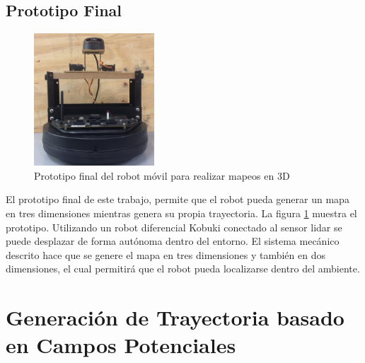 \subsection{Prototipo Final}
\begin{figure}%
	\centering \footnotesize
	\includegraphics[width=0.40\textwidth]{images/kbkiReal3D.jpg}
	\captionsetup{font=footnotesize}
	\caption{Prototipo final del robot móvil para realizar mapeos en 3D}
	\label{fig:ProtoFinal}
\end{figure}
El prototipo final de este trabajo, permite que el robot pueda generar un mapa en tres dimensiones 
mientras genera su propia trayectoria. La figura \ref{fig:ProtoFinal} muestra el prototipo. Utilizando
un robot diferencial Kobuki conectado al sensor lidar se puede desplazar de forma autónoma
dentro del entorno. El sistema mecánico descrito hace que se genere el mapa en tres dimensiones
y también en dos dimensiones, el cual permitirá que el robot pueda localizarse dentro del ambiente.



\section{Generaci\'on de Trayectoria basado en Campos Potenciales}
\label{sec:autonomia}

